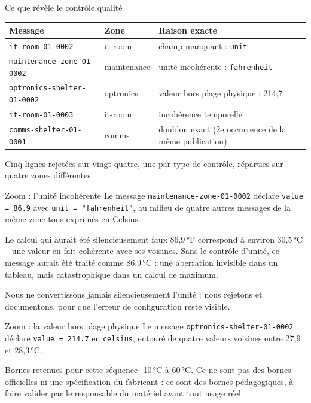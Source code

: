 \documentclass[aspectratio=169]{beamer}
\begin{document}
\begin{frame}{Ce que révèle le contrôle qualité}
  \scriptsize
  \begin{center}
  \begin{tabular}{@{}p{}p{}p{}@{}}
    \toprule
    Message & Zone & Raison exacte \\
    \midrule
    \texttt{it-room-01-0002} & it-room & champ manquant : \texttt{unit} \\[2pt]
    \texttt{maintenance-zone-01-0002} & maintenance & unité incohérente : \texttt{fahrenheit} \\[2pt]
    \texttt{optronics-shelter-01-0002} & optronics & valeur hors plage physique : 214,7 \\[2pt]
    \texttt{it-room-01-0003} & it-room & incohérence temporelle \\[2pt]
    \texttt{comms-shelter-01-0001} & comms & doublon exact (2e occurrence de la même publication) \\
    \bottomrule
  \end{tabular}
  \end{center}
  \vfill
  \normalsize Cinq lignes rejetées sur vingt-quatre, une par type de contrôle, réparties sur quatre zones différentes.
\end{frame}

\begin{frame}{Zoom : l'unité incohérente}
  Le message \texttt{maintenance-zone-01-0002} déclare \texttt{value = 86.9} avec \texttt{unit = "fahrenheit"}, au milieu de quatre autres messages de la même zone tous exprimés en Celsius.
  \begin{block}{Le calcul qui aurait été silencieusement faux}
    86,9\,°F correspond à environ 30,5\,°C -- une valeur en fait cohérente avec ses voisines. Sans le contrôle d'unité, ce message aurait été traité comme 86,9\,°C : une aberration invisible dans un tableau, mais catastrophique dans un calcul de maximum.
  \end{block}
  \alert{Nous ne convertissons jamais silencieusement l'unité : nous rejetons et documentons, pour que l'erreur de configuration reste visible.}
\end{frame}

\begin{frame}{Zoom : la valeur hors plage physique}
  Le message \texttt{optronics-shelter-01-0002} déclare \texttt{value = 214.7} en \texttt{celsius}, entouré de quatre valeurs voisines entre 27,9 et 28,3\,°C.
  \begin{block}{Bornes retenues pour cette séquence}
    -10\,°C à 60\,°C. Ce ne sont pas des bornes officielles ni une spécification du fabricant : ce sont des bornes pédagogiques, à faire valider par le responsable du matériel avant tout usage réel.
  \end{block}
\end{frame}
\end{document}
